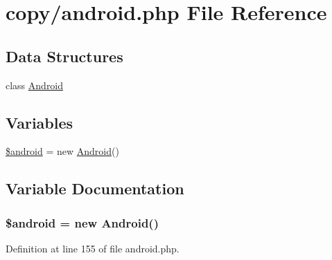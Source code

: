 \hypertarget{copy_2android_8php}{}\section{copy/android.php File Reference}
\label{copy_2android_8php}
\subsection*{Data Structures}
\begin{DoxyCompactItemize}
\item 
class \hyperlink{class_android}{Android}
\end{DoxyCompactItemize}
\subsection*{Variables}
\begin{DoxyCompactItemize}
\item 
\hyperlink{copy_2android_8php_a9860cae8b49c1a1acfb83540705701ab}{\$android} = new \hyperlink{class_android}{Android}()
\end{DoxyCompactItemize}


\subsection{Variable Documentation}
\hypertarget{copy_2android_8php_a9860cae8b49c1a1acfb83540705701ab}{}
\subsubsection[{\$android}]{\setlength{\rightskip}{0pt plus 5cm}\$android = new {\bf Android}()}\label{copy_2android_8php_a9860cae8b49c1a1acfb83540705701ab}


Definition at line 155 of file android.\+php.


